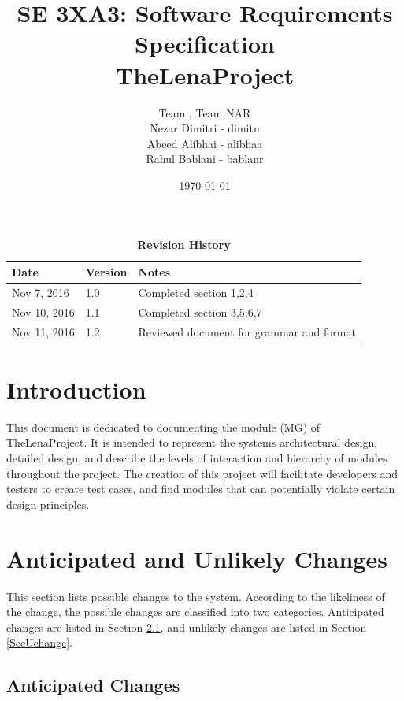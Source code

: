 \documentclass[12pt, titlepage]{article}
\title{SE 3XA3: Software Requirements Specification\\TheLenaProject}
\author{Team \1, Team NAR
		 \\ Nezar Dimitri - dimitn
		 \\ Abeed Alibhai - alibhaa
		 \\ Rahul Bablani - bablanr
}
\date{\today}
\begin{document}
\maketitle
{}
\tableofcontents
\listoftables
\listoffigures

\begin{table}[htbp]
\caption{\bf Revision History}
\begin{tabularx}{\textwidth}{p{3cm}p{2cm}X}
\toprule {\bf Date} & {\bf Version} & {\bf Notes}\\
\midrule
Nov 7, 2016 & 1.0 & Completed section 1,2,4 \\
Nov 10, 2016 & 1.1 & Completed section 3,5,6,7 \\
Nov 11, 2016 & 1.2 & Reviewed document for grammar and format\\
\bottomrule
\end{tabularx}
\end{table}

\clearpage




\section{Introduction}

This document is dedicated to documenting the module (MG) of
TheLenaProject. It is intended to represent the systems architectural design, detailed design, and describe the levels of interaction and hierarchy of modules throughout the project. The creation of this project will facilitate developers and testers to create test cases, and find modules that can potentially violate certain design principles.

\section{Anticipated and Unlikely Changes} \label{SecChange}

This section lists possible changes to the system. According to the likeliness
of the change, the possible changes are classified into two
categories. Anticipated changes are listed in Section \ref{SecAchange}, and
unlikely changes are listed in Section \ref{SecUchange}.

\subsection{Anticipated Changes} \label{SecAchange}
\end{document}
